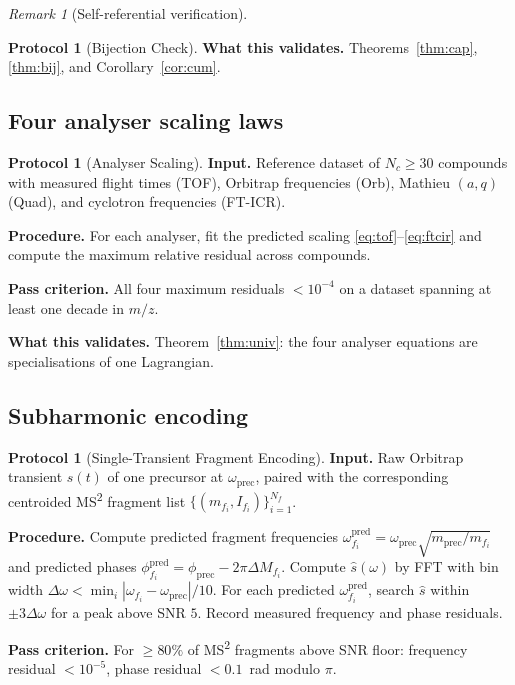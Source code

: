 \documentclass[twocolumn,10pt,a4paper]{article}
\theoremstyle{thmstyle}
\theoremstyle{definition}
\newtheorem{protocol}[theorem]{Protocol}
\theoremstyle{remark}
\newtheorem{remark}[theorem]{Remark}
\begin{document}
\begin{remark}[Self-referential verification]
\begin{protocol}[Bijection Check]
\textbf{What this validates.} Theorems~\ref{thm:cap}, \ref{thm:bij},
and Corollary~\ref{cor:cum}.
\end{protocol}

\subsection{Four analyser scaling laws}

\begin{protocol}[Analyser Scaling]
\label{prot:scale}
\textbf{Input.} Reference dataset of $N_{c}\geq 30$ compounds with
measured flight times (TOF), Orbitrap frequencies (Orb), Mathieu
$(a,q)$ (Quad), and cyclotron frequencies (FT-ICR).

\textbf{Procedure.} For each analyser, fit the predicted scaling
\eqref{eq:tof}--\eqref{eq:ftcir} and compute the maximum relative
residual across compounds.

\textbf{Pass criterion.} All four maximum residuals
$<10^{-4}$ on a dataset spanning at least one decade in $m/z$.

\textbf{What this validates.} Theorem~\ref{thm:univ}: the four
analyser equations are specialisations of one Lagrangian.
\end{protocol}

\subsection{Subharmonic encoding}

\begin{protocol}[Single-Transient Fragment Encoding]
\label{prot:sub}
\textbf{Input.} Raw Orbitrap transient $s(t)$ of one precursor at
$\omega_{\mathrm{prec}}$, paired with the corresponding centroided
MS\textsuperscript{2} fragment list
$\{(m_{f_{i}},I_{f_{i}})\}_{i=1}^{N_{f}}$.

\textbf{Procedure.} Compute predicted fragment frequencies
$\omega_{f_{i}}^{\mathrm{pred}}=\omega_{\mathrm{prec}}\sqrt{m_{\mathrm{prec}}/m_{f_{i}}}$
and predicted phases
$\phi_{f_{i}}^{\mathrm{pred}}=\phi_{\mathrm{prec}}-2\pi\Delta M_{f_{i}}$.
Compute $\hat s(\omega)$ by FFT with bin width
$\Delta\omega<\min_{i}|\omega_{f_{i}}-\omega_{\mathrm{prec}}|/10$.
For each predicted $\omega_{f_{i}}^{\mathrm{pred}}$, search $\hat s$
within $\pm 3\Delta\omega$ for a peak above SNR $5$. Record measured
frequency and phase residuals.

\textbf{Pass criterion.} For $\geq 80\%$ of MS\textsuperscript{2}
fragments above SNR floor: frequency residual $<10^{-5}$, phase
residual $<0.1$~rad modulo $\pi$.


\end{protocol}
\end{remark}
\end{document}
